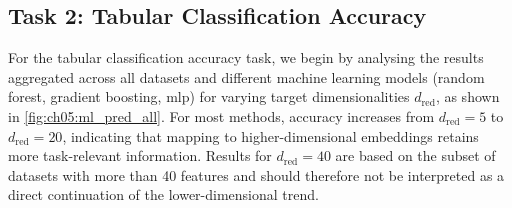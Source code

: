 


\FloatBarrier
\subsection{Task 2: Tabular Classification Accuracy}
\label{sec:ch05:res-ml-task2}

For the tabular classification accuracy task,
we begin by analysing the results aggregated across all datasets and different machine learning models (random forest, gradient boosting, \gls{mlp}) for varying target dimensionalities $d_{\mathrm{red}}$, as shown in \cref{fig:ch05:ml_pred_all}.
For most methods, accuracy increases from $d_{\mathrm{red}}=5$ to $d_{\mathrm{red}}=20$, indicating that mapping to higher-dimensional embeddings retains more task-relevant information. Results for $d_{\mathrm{red}}=40$ are based on the subset of datasets with more than 40 features and should therefore not be interpreted as a direct continuation of the lower-dimensional trend.

